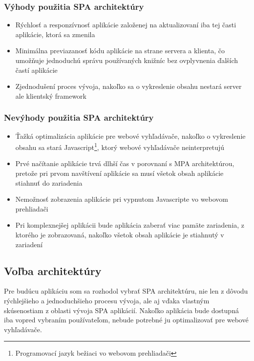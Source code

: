 \subsubsection*{Výhody použitia SPA architektúry}

\begin{itemize}
	\item Rýchlosť a responzívnosť aplikácie založenej na aktualizovaní iba tej časti aplikácie, ktorá sa zmenila \cite{spa-vs-mpa-1}
	\item Minimálna previazanosť kódu aplikácie na strane servera a klienta, čo umožňuje jednoduchú správu používaných knižníc bez ovplyvnenia ďalších častí aplikácie \cite{spa-vs-mpa-2}
	\item Zjednodušení proces vývoja, nakoľko sa o vykreslenie obsahu nestará server ale klientský framework \cite{spa-vs-mpa-3}
\end{itemize}


\subsubsection*{Nevýhody použitia SPA architektúry}

\begin{itemize}
	\item Ťažká optimalizácia aplikácie pre webové vyhľadávače, nakoľko o vykreslenie obsahu sa stará Javascript\footnote{Programovací jazyk bežiaci vo webovom prehliadači}, ktorý webové vyhľadávače neinterpretujú \cite{spa-vs-mpa-1}
	\item Prvé načítanie aplikácie trvá dlhší čas v porovnaní s MPA architektúrou, pretože pri prvom navštívení aplikácie sa musí všetok obsah aplikácie stiahnuť do zariadenia
	\item Nemožnosť zobrazenia aplikácie pri vypnutom Javascripte vo webovom prehliadači \cite{spa-vs-mpa-2}
	\item Pri komplexnejšej aplikácii bude aplikácia zaberať viac pamäte zariadenia, z ktorého je zobrazovaná, nakoľko všetok obsah aplikácie je stiahnutý v zariadení \cite{spa-vs-mpa-3}
\end{itemize}


\subsection{Voľba architektúry}

Pre budúcu aplikáciu som sa rozhodol vybrať SPA architektúru, nie len z dôvodu rýchlejšieho a jednoduchšieho procesu vývoja, ale aj vďaka vlastným skúsenostiam z oblasti vývoja SPA aplikácií. Nakoľko aplikácia bude dostupná iba vopred vybraním používateľom, nebude potrebné ju optimalizovať pre webové vyhľadávače.

